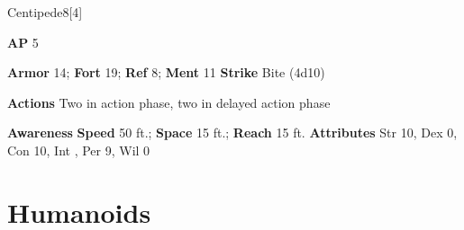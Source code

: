 \begin{monsection}[Huge]{Centipede}{8}[4]
\vspace{-1em}\vspace{-1em}
\begin{spellcontent}
\begin{spelltargetinginfo}
{\textbf{AP} 5}

\pari \textbf{Armor} 14;
\textbf{Fort} 19;
\textbf{Ref} 8;
\textbf{Ment} 11
\pari \textbf{Strike} Bite  (4d10)


\pari \textbf{Actions} Two in action phase, two in delayed action phase
\end{spelltargetinginfo}


\end{spellcontent}

\begin{monsterfooter}
\pari \textbf{Awareness} 
\pari \textbf{Speed} 50 ft.;
\textbf{Space} 15 ft.;
\textbf{Reach} 15 ft.
\pari \textbf{Attributes}
Str 10,
Dex 0,
Con 10,
Int ,
Per 9,
Wil 0
\end{monsterfooter}
\end{monsection}


\section{Humanoids}

